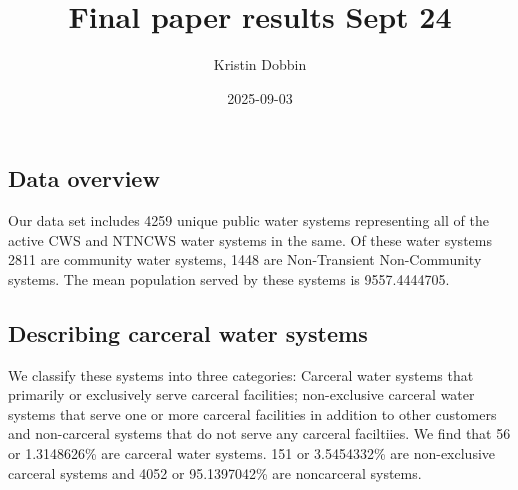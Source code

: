 \documentclass[
]{article}
\title{Final paper results Sept 24}
\author{Kristin Dobbin}
\date{2025-09-03}
\begin{document}
\maketitle

\subsection{Data overview}\label{data-overview}

Our data set includes 4259 unique public water systems representing all
of the active CWS and NTNCWS water systems in the same. Of these water
systems 2811 are community water systems, 1448 are Non-Transient
Non-Community systems. The mean population served by these systems is
9557.4444705.

\subsection{Describing carceral water
systems}\label{describing-carceral-water-systems}

We classify these systems into three categories: Carceral water systems
that primarily or exclusively serve carceral facilities; non-exclusive
carceral water systems that serve one or more carceral facilities in
addition to other customers and non-carceral systems that do not serve
any carceral faciltiies. We find that 56 or 1.3148626\% are carceral
water systems. 151 or 3.5454332\% are non-exclusive carceral systems and
4052 or 95.1397042\% are noncarceral systems.
\end{document}
